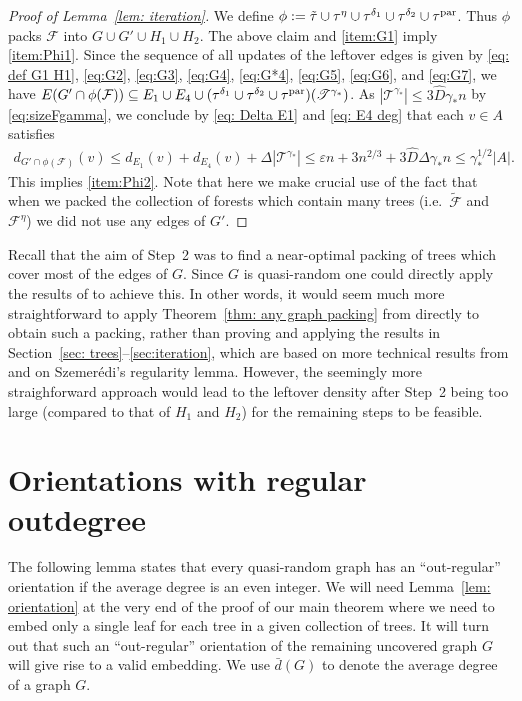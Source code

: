 \documentclass[a4paper, 11pt, reqno]{amsart}
\numberwithin{equation}{section}
\newcommand{\1}{{\rm 1\hspace*{-0.4ex}%
\rule{0.1ex}{1.52ex}\hspace*{0.2ex}}}
\newcommand{\cF}{\mathcal{F}}
\newcommand{\sF}{\mathscr{F}}
\newcommand{\sT}{\mathscr{T}}
\newcommand{\p}{{\rm par}}
\renewcommand{\epsilon}{\varepsilon}
\newcommand{\sub}{\subseteq}
\newcounter{step}
\begin{document}
\begin{proof}[Proof of Lemma~\ref{lem: iteration}]
We define $\phi:= \tilde{\tau}\cup\tau^{\eta} \cup \tau^{\delta_1} \cup \tau^{\delta_2}\cup \tau^{\p}$.
Thus $\phi$ packs $\cF$ into $G\cup G'\cup H_1\cup H_2$.
The above claim and \ref{item:G1} imply \ref{item:Phi1}.
Since the sequence of all updates of the leftover edges is given by
\eqref{eq: def G1 H1}, \eqref{eq:G2}, \eqref{eq:G3}, \eqref{eq:G4}, \eqref{eq:G*4}, \eqref{eq:G5}, \eqref{eq:G6}, and \eqref{eq:G7}, we have 
$E(G'\cap \phi(\cF))\sub E_1\cup E_4 \cup(\tau^{\delta_1} \cup \tau^{\delta_2} \cup \tau^{\p})(\sT^{\gamma_*})$.
As $|\sT^{\gamma_*}|\leq 3\hat{D}\gamma_* n$ by \eqref{eq:sizeFgamma}, 
we conclude  by \eqref{eq: Delta E1} and \eqref{eq: E4 deg} that each $v\in A$ satisfies
\begin{align*}
d_{G'\cap \phi(\cF)}(v)\leq
d_{E_1}(v) + d_{E_4}(v) + \Delta|\sT^{\gamma_*}| \leq \epsilon n + 3 n^{2/3} + 3\hat{D} \Delta\gamma_* n  \leq \gamma_*^{1/2}|A|.
\end{align*}
This implies \ref{item:Phi2}. 
Note that here we make crucial use of the fact that when we packed the collection of forests which contain many trees (i.e.~$\tilde{\cF}$ and $\sF^{\eta}$) we did not use any edges of $G'$.
\end{proof}

Recall that the aim of Step~2 was to find a near-optimal packing of trees which cover most of the edges of $G$. Since $G$ is quasi-random one could directly apply the results of \cite{KKOT16} to achieve this. In other words, it would seem much more straightforward to apply Theorem~\ref{thm: any graph packing} from \cite{KKOT16} directly to obtain such a packing, rather than proving and applying the results in Section~\ref{sec: trees}--\ref{sec:iteration}, which are based on more technical results from \cite{KKOT16} and on Szemer\'{e}di's regularity lemma. However, the seemingly more straighforward approach would lead to the leftover density after Step~2 being too large (compared to that of $H_1$ and $H_2$) for the remaining steps to be feasible.








\section{Orientations with regular outdegree}
\label{sec:orientation}

The following lemma states that every quasi-random graph has an ``out-regular'' orientation if the average degree is an even integer.
We will need Lemma~\ref{lem: orientation} at the very end of the proof of our main theorem 
where we need to embed only a single leaf for each tree in a given collection of trees.
It will turn out that such an ``out-regular'' orientation of the remaining uncovered graph $G$ will give rise to a valid embedding.
We use $\bar{d}(G)$ to denote the average degree of a graph $G$.
\end{document}
